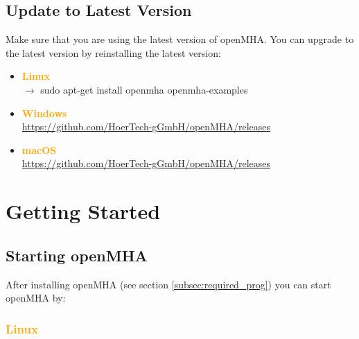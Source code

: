 \documentclass[11pt,a4paper,twoside]{article}
\newcommand{\+}{\discretionary{\mbox{\scriptsize$\hookleftarrow$}}{}{}}
\begin{document}
\subsection{Update to Latest Version}


Make sure that you are using the latest version of openMHA.
You can upgrade to the latest version by reinstalling the
latest version:

\begin{itemize}
   \item \textcolor{orange}{\textbf{Linux}} \\
   $\rightarrow$ {\ttfamily sudo apt-get install openmha openmha-examples} 
   \item \textcolor{orange}{\textbf{Windows}} \\
   \footnotesize{\url{https://github.com/HoerTech-gGmbH/openMHA/releases}}
   
   \item \textcolor{orange}{\textbf{\large{macOS}}} \\
   \footnotesize{\url{https://github.com/HoerTech-gGmbH/openMHA/releases}}
   \end{itemize}



 




\section{Getting Started}

    \subsection{Starting openMHA}
    \label{starting_openmha}
    
After installing openMHA (see section \ref{subsec:required_prog}) you can start openMHA by: 

\subsubsection*{\textcolor{orange}{\textbf{Linux}}}
\end{document}
